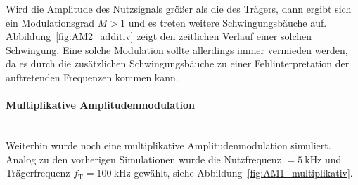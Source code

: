 \documentclass[a4paper,twoside,final]{article}
\begin{document}
Wird die Amplitude des Nutzsignals größer als die des Trägers, dann ergibt sich ein Modulationsgrad $M > 1$ und es treten weitere Schwingungsbäuche auf. Abbildung~\ref{fig:AM2_additiv} zeigt den zeitlichen Verlauf einer solchen Schwingung. Eine solche Modulation sollte allerdings immer vermieden werden, da es durch die zusätzlichen Schwingungsbäuche zu einer Fehlinterpretation der auftretenden Frequenzen kommen kann.
\FloatBarrier
\newpage
\paragraph{Multiplikative Amplitudenmodulation}$~$\\
Weiterhin wurde noch eine multiplikative Amplitudenmodulation simuliert. Analog zu den vorherigen Simulationen wurde die Nutzfrequenz $ = \SI{5}{\kilo\hertz}$ und Trägerfrequenz $f_\text{T} = \SI{100}{\kilo\hertz}$ gewählt, siehe Abbildung~\ref{fig:AM1_multiplikativ}.
\end{document}
